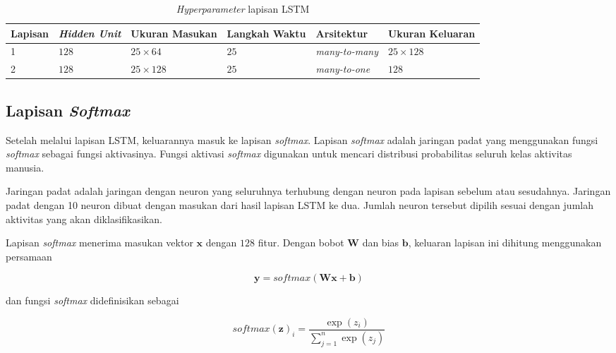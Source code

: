 \begin{table}[h!]
    \centering
    \caption{\textit{Hyperparameter} lapisan LSTM}
    \begin{tabular}{ |p{1.5cm}|p{1.5cm}|p{2cm}|p{1.7cm}|p{2.5cm}|p{2cm}| }
        \hline
        \textbf{Lapisan} & \textbf{\textit{Hidden Unit}} & \textbf{Ukuran Masukan} & \textbf{Langkah Waktu} & \textbf{Arsitektur} & \textbf{Ukuran Keluaran} \\

        \hline
        1 & $128$ & $25 \times 64$ & $25$ & \textit{many-to-many} & $25 \times 128$ \\

        \hline
        2 & $128$ & $25 \times 128$ & $25$ & \textit{many-to-one} & $128$ \\

        \hline
    \end{tabular}
    \label{table:hyperparameter-lapisan-lstm}
\end{table}

\subsection{Lapisan \textit{Softmax}}
Setelah melalui lapisan LSTM, keluarannya masuk ke lapisan \textit{softmax}. Lapisan \textit{softmax} adalah jaringan padat yang menggunakan fungsi \textit{softmax} sebagai fungsi aktivasinya. Fungsi aktivasi \textit{softmax} digunakan untuk mencari distribusi probabilitas seluruh kelas aktivitas manusia.

Jaringan padat adalah jaringan dengan neuron yang seluruhnya terhubung dengan neuron pada lapisan sebelum atau sesudahnya. Jaringan padat dengan 10 neuron dibuat dengan masukan dari hasil lapisan LSTM ke dua. Jumlah neuron tersebut dipilih sesuai dengan jumlah aktivitas yang akan diklasifikasikan.

Lapisan \textit{softmax} menerima masukan vektor $\pmb{x}$ dengan $128$ fitur. Dengan bobot $\pmb{W}$ dan bias $\pmb{b}$, keluaran lapisan ini dihitung menggunakan persamaan

\begin{equation}
    \pmb{y} = softmax(\pmb{W} \pmb{x} + \pmb{b})
\end{equation}

\noindent
dan fungsi \textit{softmax} didefinisikan sebagai

\begin{equation}
    softmax(\pmb{z})_i = \frac{\exp(z_i)}{\sum_{j=1}^n \exp(z_j)}
\end{equation}


